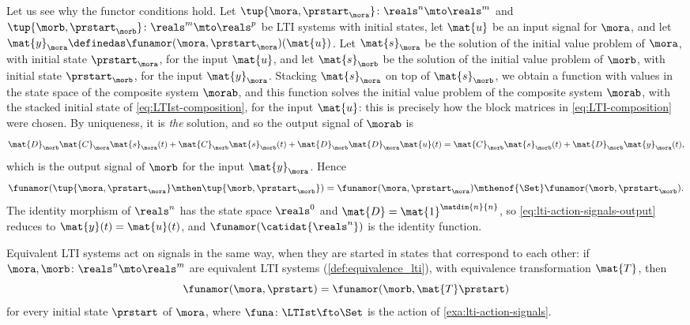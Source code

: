 \begin{example}
    Let us see why the functor conditions hold.
    Let $\tup{\mora, \prstart_\mora} \colon \reals^n \mto \reals^m$ and $\tup{\morb, \prstart_\morb} \colon \reals^m \mto \reals^p$ be LTI systems with initial states, let $\mat{u}$ be an input signal for $\mora$, and let $\mat{y}_\mora \definedas \funamor(\mora, \prstart_\mora)(\mat{u})$.
    Let $\mat{s}_\mora$ be the solution of the initial value problem of $\mora$, with initial state $\prstart_\mora$, for the input $\mat{u}$, and let $\mat{s}_\morb$ be the solution of the initial value problem of $\morb$, with initial state $\prstart_\morb$, for the input $\mat{y}_\mora$.
    Stacking $\mat{s}_\mora$ on top of $\mat{s}_\morb$, we obtain a function with values in the state space of the composite system $\morab$, and this function solves the initial value problem of the composite system $\morab$, with the stacked initial state of \cref{eq:LTIst-composition}, for the input $\mat{u}$: this is precisely how the block matrices in \cref{eq:LTI-composition} were chosen.
    By uniqueness, it is \emph{the} solution, and so the output signal of $\morab$ is
    \begin{equation}
        \mat{D}_\morb\mat{C}_\mora\mat{s}_\mora(t) + \mat{C}_\morb\mat{s}_\morb(t) + \mat{D}_\morb\mat{D}_\mora\mat{u}(t)
        = \mat{C}_\morb\mat{s}_\morb(t) + \mat{D}_\morb\mat{y}_\mora(t),
    \end{equation}
    which is the output signal of $\morb$ for the input $\mat{y}_\mora$.
    Hence
    \begin{equation}
        \funamor(\tup{\mora, \prstart_\mora} \mthen \tup{\morb, \prstart_\morb}) = \funamor(\mora, \prstart_\mora) \mthenof{\Set} \funamor(\morb, \prstart_\morb).
    \end{equation}
    The identity morphism of $\reals^n$ has the state space $\reals^0$ and $\mat{D} = \mat{1}^{\matdim{n}{n}}$, so \cref{eq:lti-action-signals-output} reduces to $\mat{y}(t) = \mat{u}(t)$, and $\funamor(\catidat{\reals^n})$ is the identity function.
\end{example}

\begin{lemma}
    \label{lem:equivsystequivact}
    Equivalent LTI systems act on signals in the same way, when they are started in states that correspond to each other: if $\mora, \morb \colon \reals^n \mto \reals^m$ are equivalent LTI systems (\cref{def:equivalence_lti}), with equivalence transformation $\mat{T}$, then
    \begin{equation}
        \funamor(\mora, \prstart) = \funamor(\morb, \mat{T}\prstart)
    \end{equation}
    for every initial state $\prstart$ of $\mora$, where $\funa \colon \LTIst \fto \Set$ is the action of \cref{exa:lti-action-signals}.
\end{lemma}

